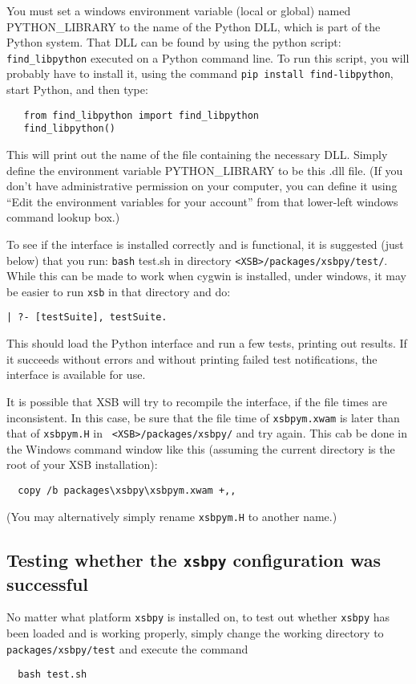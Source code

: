 You must set a windows environment variable (local or global) named
PYTHON\_LIBRARY to the name of the Python DLL, which is part of the
Python system.  That DLL can be found by using the python script:
{\tt find\_libpython} executed on a Python command line.  To run this
script, you will probably have to install it, using the command
{\tt pip install find-libpython}, start Python, and then type:
\begin{verbatim}
   from find_libpython import find_libpython
   find_libpython()
\end{verbatim}
This will print out the name of
the file containing the necessary DLL.  Simply define the environment
variable PYTHON\_LIBRARY to be this .dll file.  (If you don't have
administrative permission on your computer, you can define it using
``Edit the environment variables for your account'' from that
lower-left windows command lookup box.)

To see if the interface is installed correctly and is functional, it
is suggested (just below) that you run: {\tt bash} test.sh in
directory {\tt <XSB>/packages/xsbpy/test/}.  While this can be made to
work when cygwin is installed, under windows, it may be easier to run
{\tt xsb} in that directory and do:
\begin{verbatim}
| ?- [testSuite], testSuite.
\end{verbatim}
This should load the Python interface and run a few tests, printing
out results.  If it succeeds without errors and without printing
failed test notifications, the interface is available for use.

It is possible that XSB will try to recompile the interface, if the
file times are inconsistent.  In this case, be sure that the file time
of {\tt xsbpym.xwam} is later than that of {\tt xsbpym.H} in {\tt
  <XSB>/packages/xsbpy/} and try again.
This cab be done in the Windows command window like this (assuming
the current directory is the root of your XSB installation):
\begin{verbatim}
  copy /b packages\xsbpy\xsbpym.xwam +,,
\end{verbatim}
(You may alternatively simply
rename {\tt xsbpym.H} to another name.)

\subsection{Testing whether the {\tt xsbpy} configuration was successful}

No matter what platform {\tt xsbpy} is installed on, to test out
whether {\tt xsbpy} has been loaded and is working properly, simply
change the working directory to {\tt packages/xsbpy/test} and execute the
command

\begin{verbatim}
  bash test.sh
\end{verbatim}


